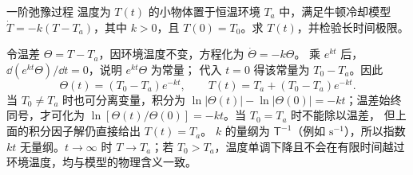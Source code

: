 \begin{origexamplebox}{一阶弛豫过程}
温度为 $T(t)$ 的小物体置于恒温环境 $T_a$ 中，满足牛顿冷却模型
$\dot T=-k(T-T_a)$，其中 $k>0$，且 $T(0)=T_0$。求 $T(t)$，并检验长时间极限。
\end{origexamplebox}
\begin{xesolution}
令温差 $\Theta=T-T_a$，因环境温度不变，方程化为 $\dot\Theta=-k\Theta$。
乘 $e^{kt}$ 后，$\dd(e^{kt}\Theta)/\dd t=0$，说明 $e^{kt}\Theta$ 为常量；
代入 $t=0$ 得该常量为 $T_0-T_a$。因此
\[
 \Theta(t)=(T_0-T_a)e^{-kt},\qquad
 \boxed{T(t)=T_a+(T_0-T_a)e^{-kt}}.
\]
当 $T_0\ne T_a$ 时也可分离变量，积分为
$\ln|\Theta(t)|-\ln|\Theta(0)|=-kt$；温差始终同号，才可化为
$\ln[\Theta(t)/\Theta(0)]=-kt$。当 $T_0=T_a$ 时不能除以温差，
但上面的积分因子解仍直接给出 $T(t)=T_a$。
$k$ 的量纲为 $\mathsf T^{-1}$（例如 $\mathrm{s^{-1}}$），所以指数 $kt$ 无量纲。$t\to\infty$ 时 $T\to T_a$；若 $T_0>T_a$，温度单调下降且不会在有限时间越过环境温度，均与模型的物理含义一致。
\end{xesolution}

